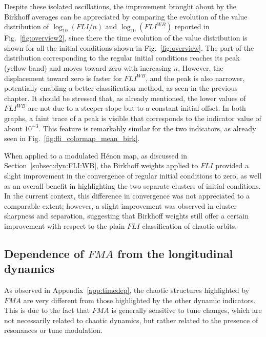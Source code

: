 Despite these isolated oscillations, the improvement brought about by the Birkhoff averages can be appreciated by comparing the evolution of the value distribution of $\log_{10}(FLI/n)$ and $\log_{10}(FLI^{WB})$ reported in Fig.~\ref{fig:overview2}, since there the time evolution of the value distribution is shown for all the initial conditions shown in Fig.~\ref{fig:overview}. The part of the distribution corresponding to the regular initial conditions reaches its peak (yellow band) and moves toward zero with increasing $n$. However, the displacement toward zero is faster for $FLI^{WB}$, and the peak is also narrower, potentially enabling a better classification method, as seen in the previous chapter. It should be stressed that, as already mentioned, the lower values of $FLI^{WB}$ are not due to a steeper slope but to a constant initial offset. In both graphs, a faint trace of a peak is visible that corresponds to the indicator value of about $10^{-3}$. This feature is remarkably similar for the two indicators, as already seen in Fig.~\ref{fig:fli_colormap_mean_birk}.

When applied to a modulated Hénon map, as discussed in Section~\ref{subsec:dyn:FLI:WB}, the Birkhoff weights applied to $FLI$ provided a slight improvement in the convergence of regular initial conditions to zero, as well as an overall benefit in highlighting the two separate clusters of initial conditions. In the current context, this difference in convergence was not appreciated to a comparable extent; however, a slight improvement was observed in cluster sharpness and separation, suggesting that Birkhoff weights still offer a certain improvement with respect to the plain $FLI$ classification of chaotic orbits. 

\subsection{Dependence of $FMA$ from the longitudinal dynamics}

As observed in Appendix~\ref{app:timedep}, the chaotic structures highlighted by $FMA$ are very different from those highlighted by the other dynamic indicators. This is due to the fact that $FMA$ is generally sensitive to tune changes, which are not necessarily related to chaotic dynamics, but rather related to the presence of resonances or tune modulation.

